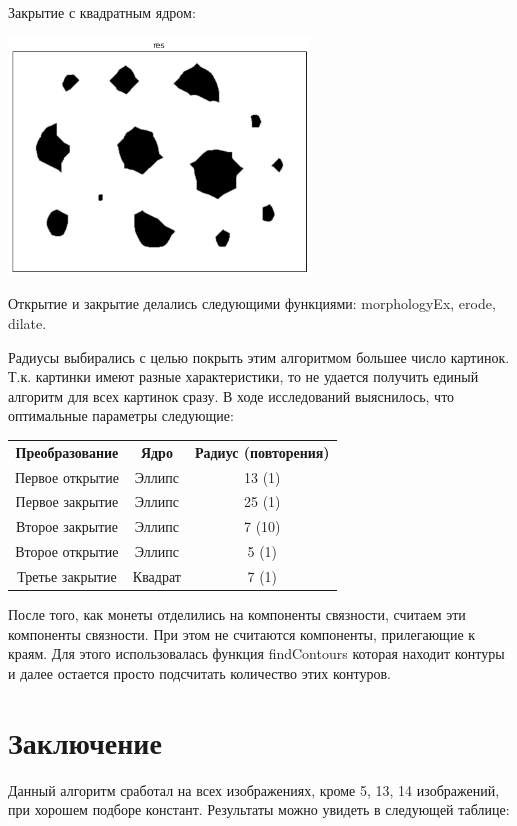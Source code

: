 \documentclass[12pt, a4paper]{article}
\begin{document}
\begin{center}
				Закрытие с квадратным ядром:

					\includegraphics[width=8cm]{dilate_rect.png}		
			\end{center}

			Открытие и закрытие делались следующими функциями: morphologyEx, erode, dilate.

			Радиусы выбирались с целью покрыть этим алгоритмом большее число картинок. Т.к. картинки имеют разные характеристики, то не удается получить единый алгоритм для всех картинок сразу. В ходе исследований выяснилось, что оптимальные параметры следующие:
			\begin{center}
			\begin{tabular}{c c c}
				{\bf Преобразование} & {\bf Ядро} & {\bf Радиус (повторения)} \\
				Первое открытие & Эллипс & 13 (1)\\
				Первое закрытие & Эллипс & 25 (1)\\
				Второе закрытие & Эллипс & 7 (10) \\
				Второе открытие & Эллипс & 5 (1) \\
				Третье закрытие & Квадрат & 7 (1) \\
			\end{tabular}
			\end{center}

			После того, как монеты отделились на компоненты связности, считаем эти компоненты связности. При этом не считаются компоненты, прилегающие к краям. Для этого использовалась функция findContours которая находит контуры и далее остается просто подсчитать количество этих контуров.

	\newpage
	\section{Заключение}

		Данный алгоритм сработал на всех изображениях, кроме 5, 13, 14 изображений, при хорошем подборе констант. Результаты можно увидеть в следующей таблице:
\end{document}
